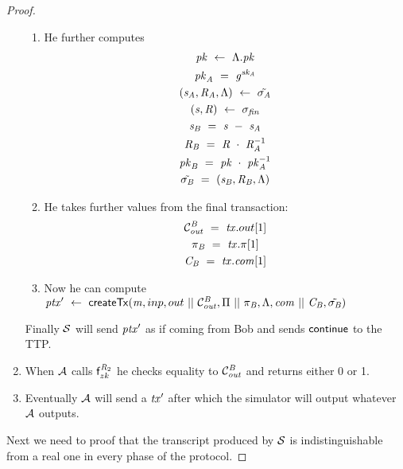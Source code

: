 \begin{proof}
\begin{enumerate}
\begin{enumerate}
            \item He further computes
            \begin{gather*}
                \mathit{pk} ~\leftarrow~ \Lambda.\mathit{pk} \\
                \mathit{pk}_{\mathit{A}} ~=~ \mathit{g}^{\mathit{sk}_{\mathit{A}}} \\
                (\mathit{s}_{\mathit{A}}, \mathit{R}_{\mathit{A}}, \Lambda) ~\leftarrow~ \tilde{\sigma_{\mathit{A}}} \\
                (\mathit{s}, \mathit{R}) ~\leftarrow~ \sigma_{\mathit{fin}} \\
                \mathit{s}_{\mathit{B}} ~=~ \mathit{s} ~-~ \mathit{s}_{\mathit{A}} \\
                \mathit{R}_{\mathit{B}} ~=~ \mathit{R} ~\cdot~ \mathit{R}_{\mathit{A}}^{-1} \\
                \mathit{pk}_{\mathit{B}} ~=~ \mathit{pk} ~\cdot~ \mathit{pk}_{\mathit{A}}^{-1} \\
                \tilde{\sigma_{\mathit{B}}} ~=~ (\mathit{s}_{\mathit{B}}, \mathit{R}_{\mathit{B}}, \Lambda)
            \end{gather*}
            \item He takes further values from the final transaction:
            \begin{gather*}
                \mathcal{C}_{\mathit{out}}^{\mathit{B}} ~=~ \mathit{tx}.out[1] \\
                \pi_{\mathit{B}} ~=~ \mathit{tx}.\pi[1] \\
                \mathit{C}_{\mathit{B}} ~=~ \mathit{tx}.\mathit{com}[1]
            \end{gather*}
            \item Now he can compute ${\mathit{ptx}}' ~\leftarrow~ \mathsf{createTx}(\mathit{m},inp,out ~||~ \mathcal{C}_{\mathit{out}}^{\mathit{B}},\Pi ~||~ \pi_{\mathit{B}},\Lambda,\mathit{com} ~||~ \mathit{C}_{\mathit{B}},\tilde{\sigma_{\mathit{B}}})$
        \end{enumerate}
        Finally $\mathcal{S}$ will send ${\mathit{ptx}}'$ as if coming from Bob and sends $\mathsf{continue}$ to the TTP.
        \item When $\mathcal{A}$ calls $\mathsf{f}^{\mathit{R}_2}_{zk}$ he checks equality to $\mathcal{C}_{\mathit{out}}^{\mathit{B}}$ and returns either 0 or 1.
        \item Eventually $\mathcal{A}$ will send a ${\mathit{tx}}'$ after which the simulator will output whatever $\mathcal{A}$ outputs.
    \end{enumerate}
    Next we need to proof that the transcript produced by $\mathcal{S}$ is indistinguishable from a real one in every phase of the protocol.

\end{proof}
